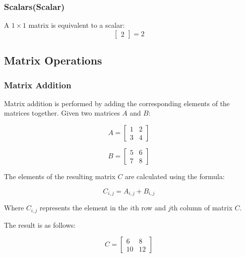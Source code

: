 \documentclass{article}
\begin{document}
\subsubsection{Scalars(Scalar)}
A $1 \times 1$ matrix is equivalent to a scalar:
\begin{equation*}
    \begin{bmatrix} 2 \end{bmatrix} = 2
\end{equation*}

\subsection{Matrix Operations}
\subsubsection{Matrix Addition}  
Matrix addition is performed by adding the corresponding elements of the matrices together. Given two matrices \(A\) and \(B\):

\begin{equation*}
    A = \begin{bmatrix} 1 & 2 \\ 3 & 4 \end{bmatrix}
\end{equation*}

\begin{equation*}
    B = \begin{bmatrix} 5 & 6 \\ 7 & 8 \end{bmatrix}
\end{equation*}

The elements of the resulting matrix \(C\) are calculated using the formula:

\begin{equation*}
    C_{i,j} = A_{i,j} + B_{i,j}
\end{equation*}

Where \(C_{i,j}\) represents the element in the \(i\)th row and \(j\)th column of matrix \(C\).

The result is as follows:

\begin{equation*}
    C = \begin{bmatrix} 6 & 8 \\ 10 & 12 \end{bmatrix}
\end{equation*}
\end{document}
